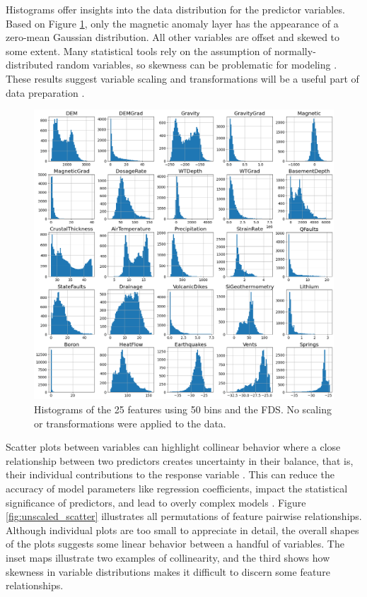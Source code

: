 Histograms offer insights into the data distribution for the predictor variables. Based on Figure \ref{fig:unscaled_hists}, only the magnetic anomaly layer has the appearance of a zero-mean Gaussian distribution. All other variables are offset and skewed to some extent. Many statistical tools rely on the assumption of normally-distributed random variables, so skewness can be problematic for modeling \citep[p.\ 85]{montgomery_statistical_2012}.  These results suggest variable scaling and transformations will be a useful part of data preparation \citep[p.\ 221]{montgomery_statistical_2012}. 

\begin{figure}[!htp]
\centering
\includegraphics[width=\textwidth]{templates/images/Figure-Unscaled_Histograms.png}
\caption[Unscaled FDS histograms]{Histograms of the 25 features using 50 bins and the FDS. No scaling or transformations were applied to the data.}
\label{fig:unscaled_hists}
\end{figure}

Scatter plots between variables can highlight collinear behavior where a close relationship between two predictors creates uncertainty in their balance, that is, their individual contributions to the response variable \citep[p.\ 99]{james_introduction_2013}. This can reduce the accuracy of model parameters like regression coefficients, impact the statistical significance of predictors, and lead to overly complex models \citep[p.\ 100-101]{james_introduction_2013}. Figure \ref{fig:unscaled_scatter} illustrates all permutations of feature pairwise relationships. Although individual plots are too small to appreciate in detail, the overall shapes of the plots suggests some linear behavior between a handful of variables. The inset maps illustrate two examples of collinearity, and the third shows how skewness in variable distributions makes it difficult to discern some feature relationships.


